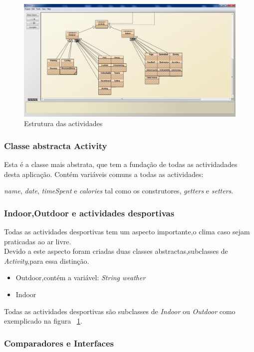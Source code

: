 \documentclass[10pt,notitlepage]{article}
\begin{document}
\begin{figure}[ht]
\centering
\includegraphics[scale=0.5]{Activity.jpg}
\caption{Estrutura das actividades}
\label{fig:actividades}
\end{figure}


\subsubsection{Classe abstracta Activity}

Esta é a classe mais abstrata, que tem a fundação de todas as actividadades desta aplicação. Contém variáveis comuns a todas as actividades:

 \textit{name}, \textit{date}, \textit{timeSpent} e \textit{calories} tal como os construtores, \textit{getters} e  \textit{setters}.

\subsubsection{Indoor,Outdoor e actividades desportivas}
Todas as actividades desportivas tem um aspecto importante,o clima caso sejam praticadas ao ar livre.\\
Devido a este aspecto foram criadas duas classes abstractas,subclasses de \textit{Activity},para essa distinção.  
\begin{itemize}
\item Outdoor,contém a variável: \textit{String weather}  
\item Indoor
\end{itemize}

Todas as actividades desportivas são subclasses de \textit{Indoor} ou \textit{Outdoor} como exemplicado na figura ~\ref{fig:actividades}. 
\subsubsection{Comparadores e Interfaces}
\end{document}
